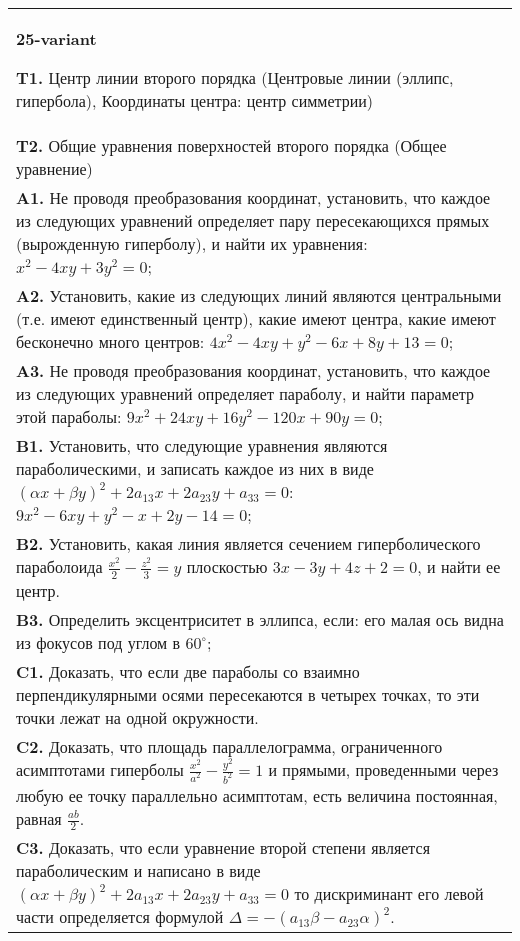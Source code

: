 \documentclass{article}
\begin{document}
\begin{tabular}{m{17cm}}
\textbf{25-variant}
\newline

\textbf{T1.} Центр линии второго порядка (Центровые линии (эллипс, гипербола), Координаты центра: центр симметрии) \\
\textbf{T2.} Общие уравнения поверхностей второго порядка (Общее уравнение) \\
\textbf{A1.} Не проводя преобразования координат, установить, что каждое из следующих уравнений определяет пару пересекающихся прямых (вырожденную гиперболу), и найти их уравнения: $x^2-4 x y+3 y^2=0$; \\
\textbf{A2.} Установить, какие из следующих линий являются центральными (т.е. имеют единственный центр), какие имеют центра, какие имеют бесконечно много центров: $4 x^2-4 x y+y^2-6 x+8 y+13=0$; \\
\textbf{A3.} Не проводя преобразования координат, установить, что каждое из следующих уравнений определяет параболу, и найти параметр этой параболы: $9 x^2+24 x y+16 y^2-120 x+90 y=0$; \\
\textbf{B1.} Установить, что следующие уравнения являются параболическими, и записать каждое из них в виде $(\alpha x+\beta y)^2+2 a_{13} x+2 a_{23} y+a_{33}=0$: $9 x^2-6 x y+y^2-x+2 y-14=0$; \\
\textbf{B2.} Установить, какая линия является сечением гиперболического параболоида $\frac{x^2}{2}-\frac{z^2}{3}=y$ плоскостью $3 x-3 y+4 z+2=0$, и найти ее центр. \\
\textbf{B3.} Определить эксцентриситет в эллипса, если: его малая ось видна из фокусов под углом в $60^{\circ}$; \\
\textbf{C1.} Доказать, что если две параболы со взаимно перпендикулярными осями пересекаются в четырех точках, то эти точки лежат на одной окружности. \\
\textbf{C2.} Доказать, что площадь параллелограмма, ограниченного асимптотами гиперболы $\frac{x^2}{a^2}-\frac{y^2}{b^2}=1$ и прямыми, проведенными через любую ее точку параллельно асимптотам, есть величина постоянная, равная $\frac{a b}{2}$. \\
\textbf{C3.} Доказать, что если уравнение второй степени является параболическим и написано в виде $ (\alpha x+\beta y) ^2+2a_{13}x+2a_{23}y+a_{33}=0$ то дискриминант его левой части определяется формулой $\Delta=- (a_{13} \beta-a_{23} \alpha) ^2$. \\

\end{tabular}
\vspace{1cm}
\end{document}

